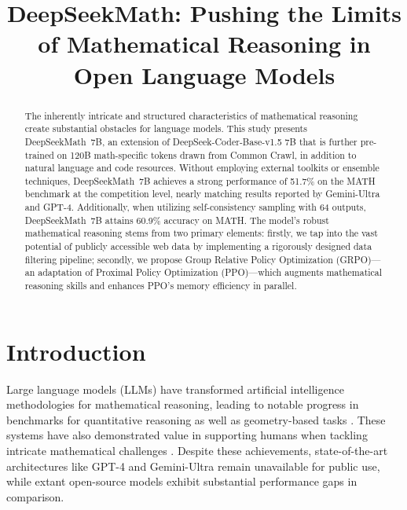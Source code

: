 \title{DeepSeekMath: Pushing the Limits of Mathematical Reasoning in Open Language Models}

\begin{abstract}
The inherently intricate and structured characteristics of mathematical reasoning create substantial obstacles for language models. This study presents DeepSeekMath~7B, an extension of DeepSeek-Coder-Base-v1.5 7B that is further pre-trained on 120B math-specific tokens drawn from Common Crawl, in addition to natural language and code resources. Without employing external toolkits or ensemble techniques, DeepSeekMath~7B achieves a strong performance of 51.7\% on the MATH benchmark at the competition level, nearly matching results reported by Gemini-Ultra and GPT-4. Additionally, when utilizing self-consistency sampling with 64 outputs, DeepSeekMath~7B attains 60.9\% accuracy on MATH. The model's robust mathematical reasoning stems from two primary elements: firstly, we tap into the vast potential of publicly accessible web data by implementing a rigorously designed data filtering pipeline; secondly, we propose Group Relative Policy Optimization (GRPO)—an adaptation of Proximal Policy Optimization (PPO)—which augments mathematical reasoning skills and enhances PPO's memory efficiency in parallel.
\end{abstract}

\section{Introduction}

Large language models (LLMs) have transformed artificial intelligence methodologies for mathematical reasoning, leading to notable progress in benchmarks for quantitative reasoning \citep{MATH} as well as geometry-based tasks \citep{trinh2024solving}. These systems have also demonstrated value in supporting humans when tackling intricate mathematical challenges \citep{tao}. Despite these achievements, state-of-the-art architectures like GPT-4 \citep{gpt4} and Gemini-Ultra \citep{gemini} remain unavailable for public use, while extant open-source models exhibit substantial performance gaps in comparison.

